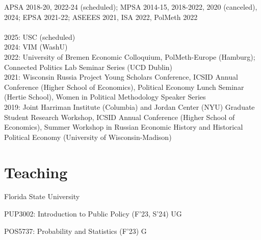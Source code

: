 \documentclass[margin,line,10.95pt]{res}
\newenvironment{list1}{
  \begin{list}{\ding{113}}{%
      \setlength{\itemsep}{0in}
      \setlength{\parsep}{0in} \setlength{\parskip}{0in}
      \setlength{\topsep}{0in} \setlength{\partopsep}{0in}
      \setlength{\leftmargin}{0.17in}}}{\end{list}}
\begin{document}
\begin{resume}
APSA 2018-20, 2022-24 (scheduled); MPSA 2014-15, 2018-2022, 2020 (canceled), 2024; EPSA 2021-22; ASEEES 2021, ISA 2022, PolMeth 2022
\\
\\
2025: USC (scheduled)\\
2024: VIM (WashU) \\
2022: University of Bremen Economic Colloquium, PolMeth-Europe (Hamburg); Connected Politics Lab Seminar Series (UCD Dublin)
\\
2021: Wisconsin Russia Project Young Scholars Conference, ICSID Annual Conference (Higher School of Economics), Political Economy Lunch Seminar (Hertie School), Women in Political Methodology Speaker Series
\\
2019: Joint Harriman Institute (Columbia) and Jordan Center (NYU) Graduate Student Research Workshop,  ICSID Annual Conference (Higher School of Economics), Summer Workshop in Russian Economic History and Historical Political Economy (University of Wisconsin-Madison) 


\section{\sc Teaching }

{Florida State University}\\
\vspace*{-.1in}
\begin{list1}
\item[] PUP3002: Introduction to Public Policy (F'23, S'24) UG
\item[] POS5737: Probability and Statistics (F'23) G
\end{list1}






\end{resume}
\end{document}
